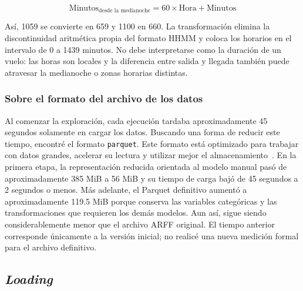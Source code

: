 \documentclass[a4paper,12pt,twocolumn]{report}
\begin{document}
{\small
\begin{equation*}
	\text{Minutos}_{\text{desde la medianoche}} = 60 \times \text{Hora} + \text{Minutos}
\end{equation*}
}

Así, 1059 se convierte en 659 y 1100 en 660. La transformación elimina la discontinuidad aritmética propia del formato HHMM y coloca los horarios en el intervalo de 0 a 1439 minutos. No debe interpretarse como la duración de un vuelo: las horas son locales y la diferencia entre salida y llegada también puede atravesar la medianoche o zonas horarias distintas.

\subsubsection{Sobre el formato del archivo de los datos}

Al comenzar la exploración, cada ejecución tardaba aproximadamente 45 segundos solamente en cargar los datos. Buscando una forma de reducir este tiempo, encontré el formato \lstinline[style=pythonish]|parquet|. Este formato está optimizado para trabajar con datos grandes, acelerar su lectura y utilizar mejor el almacenamiento~\cite{ibmQuApache}.
\newline
En la primera etapa, la representación reducida orientada al modelo manual pasó de aproximadamente 385 MiB a 56 MiB y su tiempo de carga bajó de 45 segundos a 2 segundos o menos. Más adelante, el Parquet definitivo aumentó a aproximadamente 119.5 MiB porque conserva las variables categóricas y las transformaciones que requieren los demás modelos. Aun así, sigue siendo considerablemente menor que el archivo ARFF original. El tiempo anterior corresponde únicamente a la versión inicial; no realicé una nueva medición formal para el archivo definitivo.

\subsection{\textit{Loading}}
\end{document}
